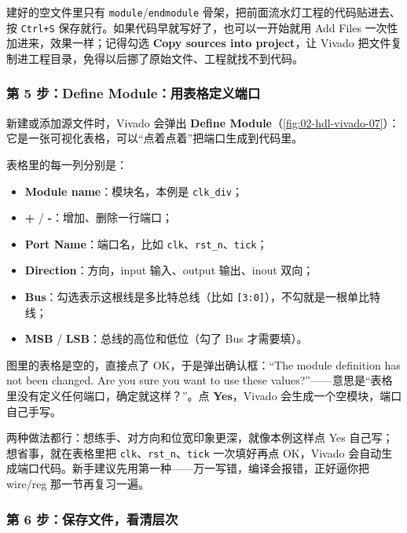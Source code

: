 建好的空文件里只有 \texttt{module}/\texttt{endmodule} 骨架，把前面流水灯工程的代码贴进去、按 \texttt{Ctrl+S} 保存就行。如果代码早就写好了，也可以一开始就用 Add Files 一次性加进来，效果一样；记得勾选 \textbf{Copy sources into project}，让 Vivado 把文件复制进工程目录，免得以后挪了原始文件、工程就找不到代码。

\subsubsection*{第 5 步：Define Module：用表格定义端口}

新建或添加源文件时，Vivado 会弹出 \textbf{Define Module}（\cref{fig:02-hdl-vivado-07}）：它是一张可视化表格，可以“点着点着”把端口生成到代码里。


表格里的每一列分别是：

\begin{itemize}
  \item \textbf{Module name}：模块名，本例是 \texttt{clk\_div}；
  \item \textbf{+} / \textbf{-}：增加、删除一行端口；
  \item \textbf{Port Name}：端口名，比如 \texttt{clk}、\texttt{rst\_n}、\texttt{tick}；
  \item \textbf{Direction}：方向，input 输入、output 输出、inout 双向；
  \item \textbf{Bus}：勾选表示这根线是多比特总线（比如 \texttt{[3:0]}），不勾就是一根单比特线；
  \item \textbf{MSB} / \textbf{LSB}：总线的高位和低位（勾了 Bus 才需要填）。
\end{itemize}

图里的表格是空的，直接点了 OK，于是弹出确认框：“The module definition has not been changed. Are you sure you want to use these values?”——意思是“表格里没有定义任何端口，确定就这样？”。点 \textbf{Yes}，Vivado 会生成一个空模块，端口自己手写。

两种做法都行：想练手、对方向和位宽印象更深，就像本例这样点 Yes 自己写；想省事，就在表格里把 \texttt{clk}、\texttt{rst\_n}、\texttt{tick} 一次填好再点 OK，Vivado 会自动生成端口代码。新手建议先用第一种——万一写错，编译会报错，正好逼你把 wire/reg 那一节再复习一遍。

\subsubsection*{第 6 步：保存文件，看清层次}


